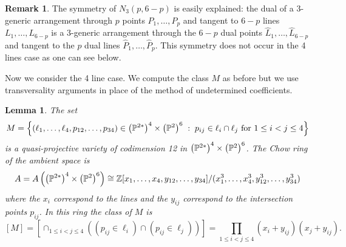 \documentclass[12pt]{article}
\theoremstyle{plain}
\newtheorem{lemma}[theorem]{Lemma}
\theoremstyle{definition}
\newtheorem{remark}[theorem]{Remark}
\newcommand{\N}{N}
\newcommand{\Z}{\mathbb{Z}}
\renewcommand{\P}{\ensuremath \mathbb{P}}
\begin{document}
\begin{remark}
The symmetry of $\N_3(p,6-p)$  is easily explained: the dual of a
3-generic arrangement through $p$ points $P_1,\ldots,P_p$ and tangent
to $6-p$ lines $L_1,\ldots,L_{6-p}$
is a 3-generic arrangement through the $6-p$ dual points
$\hat{L}_1,\ldots,\hat{L}_{6-p}$ and tangent to the $p$ dual lines
$\hat{P}_1,\ldots,\hat{P}_p$. This symmetry does not occur in the 4 lines case as one can see below.\end{remark}

Now we consider the 4 line case. We compute the class $M$ as before but we use transversality arguments in place of the method of undetermined coefficients.

\begin{lemma}\label{4linesM}
The set
$$ M = \left\{(\ell_1,\dots,\ell_4,p_{12},\dots,p_{34}) \in 
\left( \P^{2*}\right)^{4}\times \left( \P^{2}\right)^{6} \; : \; p_{ij} \in
\ell_i \cap \ell_j  \text{ for $1 \leq i < j \leq 4$} \right\}$$ 
is a quasi-projective variety of codimension 12 in $\left( \P^{2*}\right)^{4}\times \left( \P^{2}\right)^{6}$. The Chow ring of the ambient space is $$A=A\left(\left( \P^{2*}\right)^{4}\times \left( \P^{2}\right)^{6}\right) \cong \Z[x_1,\dots, x_4,y_{12},\dots , y_{34}]/(x_1^3,\dots,x_4^3,y_{12}^3,\dots,y_{34}^3)$$ where the $x_i$ correspond to the lines and the $y_{ij}$ correspond to the intersection points $p_{ij}$. In this ring the class of $M$ is $$[M]=\left[\cap_{1 \leq i < j \leq 4} \left( (p_{ij} \in \ell_i) \cap (p_{ij}
\in \ell_j)\right)\right] = \prod_{1 \leq i < j \leq 4} (x_i 
+ y_{ij})(x_j + y_{ij}) .$$

\end{lemma}
\end{document}
